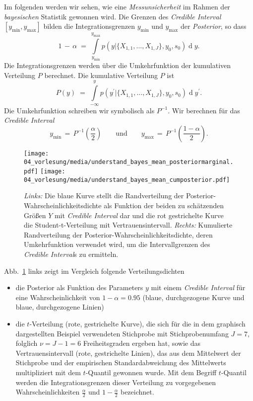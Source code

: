 Im folgenden werden wir sehen, wie eine \textsl{Messunsicherheit} im Rahmen der
\textsl{bayesischen} Statistik gewonnen wird.
Die Grenzen des \textsl{Credible Interval} $[y_\mathrm{min}, y_\mathrm{max}]$ bilden die
Integrationsgrenzen $y_\mathrm{min}$ und $y_\mathrm{max}$ der \textsl{Posterior}, so dass
\begin{equation}
1 \, - \, \alpha \; = \;
\int\limits_{y_\mathrm{min}}^{y_\mathrm{max}} p(y | \{X_{1,1}, \dots, X_{1,J}\}, y_0, s_0)
\operatorname{d}y .
\label{UeberdeckungPosterior}
\end{equation}
Die Integrationsgrenzen werden über die Umkehrfunktion der kumulativen Verteilung $P$ berechnet.
Die kumulative Verteilung $P$ ist
\begin{equation}
P(y) \; = \; \int\limits_{-\infty}^{y} p(y^\prime | \{X_{1,1}, \dots, X_{1,J}\}, y_0, s_0)
\operatorname{d}y^\prime .
\end{equation}
Die Umkehrfunktion schreiben wir symbolisch als $P^{-1}$.
Wir berechnen für das \textsl{Credible Interval}
\begin{equation}
y_\mathrm{min} \, = \, P^{-1}(\frac{\alpha}{2}) \qquad \mathrm{und} \qquad
y_\mathrm{max} \, = \, P^{-1}(\frac{1-\alpha}{2}).
\end{equation}
\begin{figure}
\begin{center}
\texttt{[image: 04\_vorlesung/media/understand\_bayes\_mean\_posteriormarginal.pdf]}
\hspace{5mm}
\texttt{[image: 04\_vorlesung/media/understand\_bayes\_mean\_cumposterior.pdf]}
\caption{\label{posteriorCredible}\textsl{Links:} Die blaue Kurve stellt die
Randverteilung der Posterior-Wahrscheinlichkeitsdichte als Funktion
der beiden zu schätzenden Größen $Y$ mit \textsl{Credible Interval} dar und die
rot gestrichelte Kurve die Student-t-Verteilung mit Vertrauensintervall.
\textsl{Rechts:} Kumulierte Randverteilung der Posterior-Wahrscheinlichkeitsdichte, deren
Umkehrfunktion verwendet wird, um die Intervallgrenzen des \textsl{Credible Interval}s zu ermitteln.}
\end{center}
\end{figure}
Abb.~\ref{posteriorCredible} links zeigt im Vergleich folgende Verteilungsdichten
\begin{itemize}
\item die Posterior als Funktion des Parameters
$y$ mit einem \textsl{Credible Interval} für eine Wahrscheinlichkeit von
$1 - \alpha = 0.95$ (blaue, durchgezogene Kurve und blaue, durchgezogene Linien)
\item die $t$-Verteilung (rote, gestrichelte Kurve), die sich für die in dem
graphisch dargestellten Beispiel verwendeten Stichprobe mit Stichprobenumfang $J = 7$, folglich
$\nu = J - 1 = 6$ Freiheitsgraden ergeben hat, sowie das Vertrauensintervall (rote, gestrichelte Linien),
das aus dem Mittelwert der Stichprobe
und der empirischen Standardabweichung des Mittelwerts multipliziert mit dem
$t$-Quantil gewonnen wurde. Mit dem Begriff $t$-Quantil werden die Integrationsgrenzen dieser Verteilung
zu vorgegebenen Wahrscheinlichkeiten $\frac{\alpha}{2}$ und $1 - \frac{\alpha}{2}$ bezeichnet.
\end{itemize}

